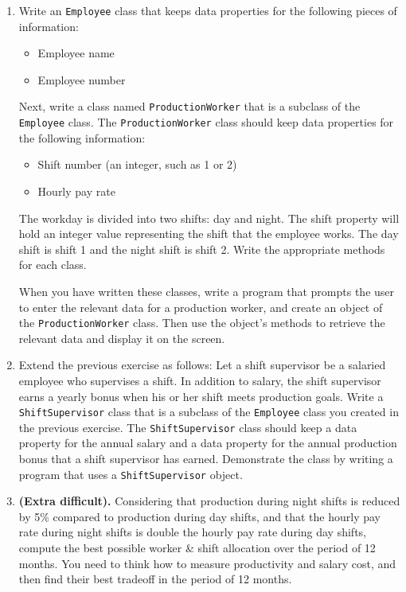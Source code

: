 \begin{enumerate}
\item Write an \texttt{Employee} class that keeps data properties for the following pieces of information: 
  \begin{itemize}
  \item Employee name
  \item Employee number
  \end{itemize}
  Next, write a class named \texttt{ProductionWorker} that is a subclass of the \texttt{Employee} class. The \texttt{ProductionWorker} class should keep data properties for the following information:
  \begin{itemize}
  \item Shift number (an integer, such as 1 or 2)
  \item Hourly pay rate
  \end{itemize}
  The workday is divided into two shifts: day and night. The shift property will hold an integer value representing the shift that the employee works. The day shift is shift 1 and the night shift is shift 2. Write the appropriate methods for each class.
  
When you have written these classes, write a program that prompts the
user to enter the relevant data for a production worker, and create an
object of the \texttt{ProductionWorker} class. Then use the object's
methods to retrieve the relevant data and display it on the screen.
  
\item Extend the previous exercise as follows: Let a shift supervisor be a salaried employee who supervises a shift. In addition to salary, the shift supervisor earns a yearly bonus when his or her shift meets production goals. Write a \texttt{ShiftSupervisor} class that is a subclass of the \texttt{Employee} class you created in the previous exercise. The \texttt{ShiftSupervisor} class should keep a data property for the annual salary and a data property for the annual production bonus that a shift supervisor has earned. Demonstrate the class by writing a program that uses a \texttt{ShiftSupervisor} object.
  
\item \textbf{(Extra difficult).} Considering that production during night shifts is reduced by 5\% compared to production during day shifts, and that the hourly pay rate during night shifts is double the hourly pay rate during day shifts, compute the best possible worker \& shift allocation over the period of 12 months. You need to think how to measure productivity and salary cost, and then find their best tradeoff in the period of 12 months.
\end{enumerate}

